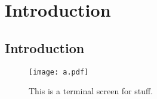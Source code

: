 \chapter{Introduction}
	\label{chapter:introduction}

\graphicspath{{figures/chapter-1/}}


\section{Introduction}

\lipsum[1-6]\cite{Narten1967}

\begin{figure}[h]
\texttt{[image: a.pdf]}
\caption[This is a short caption]{This is a terminal screen for stuff.\cite{Narten1967}}
\end{figure}


